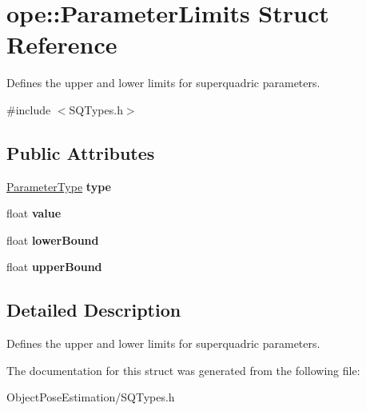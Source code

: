 \hypertarget{structope_1_1_parameter_limits}{\section{ope\-:\-:Parameter\-Limits Struct Reference}
\label{structope_1_1_parameter_limits}
}


Defines the upper and lower limits for superquadric parameters.  




{\ttfamily \#include $<$S\-Q\-Types.\-h$>$}

\subsection*{Public Attributes}
\begin{DoxyCompactItemize}
\item 
\hypertarget{structope_1_1_parameter_limits_a1aeec9602b876c0fab52460339745f13}{\hyperlink{namespaceope_a369d89d74d4649418822f9acefc317c6}{Parameter\-Type} {\bfseries type}}\label{structope_1_1_parameter_limits_a1aeec9602b876c0fab52460339745f13}

\item 
\hypertarget{structope_1_1_parameter_limits_a81b59ca8c10957de445cb930df6215c9}{float {\bfseries value}}\label{structope_1_1_parameter_limits_a81b59ca8c10957de445cb930df6215c9}

\item 
\hypertarget{structope_1_1_parameter_limits_a9ab18aa2f874616f111d0b8b43893215}{float {\bfseries lower\-Bound}}\label{structope_1_1_parameter_limits_a9ab18aa2f874616f111d0b8b43893215}

\item 
\hypertarget{structope_1_1_parameter_limits_a3d5e3db88f2f9f21ff03a24ed5612e40}{float {\bfseries upper\-Bound}}\label{structope_1_1_parameter_limits_a3d5e3db88f2f9f21ff03a24ed5612e40}

\end{DoxyCompactItemize}


\subsection{Detailed Description}
Defines the upper and lower limits for superquadric parameters. 

The documentation for this struct was generated from the following file\-:\begin{DoxyCompactItemize}
\item 
Object\-Pose\-Estimation/S\-Q\-Types.\-h\end{DoxyCompactItemize}
